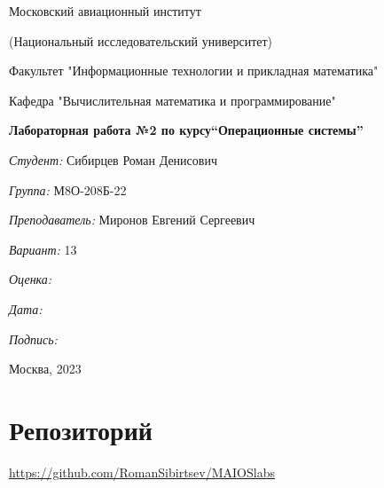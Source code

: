 \documentclass[a4paper, 12pt]{article}
\begin{document}
\thispagestyle{empty}	
\begin{center}
	Московский авиационный институт
	
	(Национальный исследовательский университет)
	
	Факультет "Информационные технологии и прикладная математика"
	
	Кафедра "Вычислительная математика и программирование"
	
\end{center}
\vspace{40ex}
\begin{center}
	\textbf{\large{Лабораторная работа №2 по курсу\linebreak \textquotedblleft Операционные системы\textquotedblright}}
\end{center}
\vspace{35ex}
\begin{flushright}
	\textit{Студент: } Сибирцев Роман Денисович
	
	\vspace{2ex}
	\textit{Группа: } М8О-208Б-22
	
	\vspace{2ex}
	\textit{Преподаватель: } Миронов Евгений Сергеевич
	
	\vspace{2ex}
	\textit{Вариант: } 13
	
	\vspace{2ex}
	\textit{Оценка: } \underline{\quad\quad\quad\quad\quad\quad}
	
	 \vspace{2ex}
	\textit{Дата: } \underline{\quad\quad\quad\quad\quad\quad}
	
	\vspace{2ex}
	\textit{Подпись: } \underline{\quad\quad\quad\quad\quad\quad}
	
\end{flushright}

\vspace{5ex}

\begin{vfill}
	\begin{center}
		Москва, 2023
	\end{center}	
\end{vfill}
\newpage


\begingroup
\color{black}
\tableofcontents\newpage
\endgroup

\section{Репозиторий}
\href{https://github.com/RomanSibirtsev/MAI_OS_labs}{https://github.com/RomanSibirtsev/MAIOSlabs}
\end{document}
